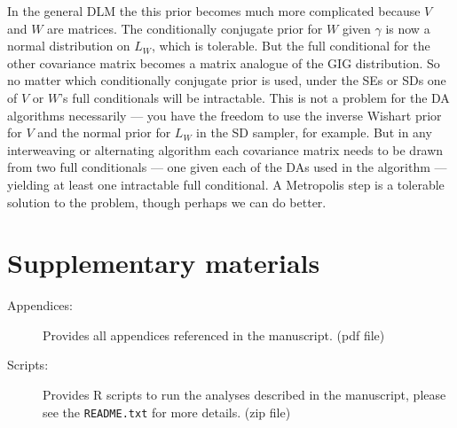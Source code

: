 \documentclass[12pt]{article}
\begin{document}
In the general DLM the this prior becomes much more complicated because $V$ and $W$ are matrices. The conditionally conjugate prior for $W$ given $\gamma$ is now a normal distribution on $L_W$, which is tolerable. But the full conditional for the other covariance matrix becomes a matrix analogue of the GIG distribution. So no matter which conditionally conjugate prior is used, under the SEs or SDs one of $V$ or $W$'s full conditionals will be intractable. This is not a problem for the DA algorithms necessarily --- you have the freedom to use the inverse Wishart prior for $V$ and the normal prior for $L_W$ in the SD sampler, for example. But in any interweaving or alternating algorithm each covariance matrix needs to be drawn from two full conditionals --- one given each of the DAs used in the algorithm --- yielding at least one intractable full conditional. A Metropolis step is a tolerable solution to the problem, though perhaps we can do better.


\section{Supplementary materials}\label{sec:Supp}

\begin{description}

\item[Appendices:] Provides all appendices referenced in the manuscript. (pdf file)

\item[Scripts:] Provides R scripts to run the analyses described in the manuscript, please see the \texttt{README.txt} for more details. (zip file)

\end{description}
\end{document}
